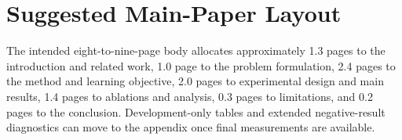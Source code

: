 \documentclass{article}
\begin{document}
\section{Suggested Main-Paper Layout}

The intended eight-to-nine-page body allocates approximately 1.3 pages to the introduction and related work, 1.0 page to the problem formulation, 2.4 pages to the method and learning objective, 2.0 pages to experimental design and main results, 1.4 pages to ablations and analysis, 0.3 pages to limitations, and 0.2 pages to the conclusion. Development-only tables and extended negative-result diagnostics can move to the appendix once final measurements are available.
\end{document}
